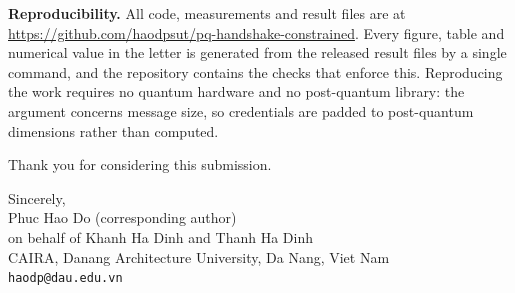 \documentclass[11pt]{article}
\begin{document}
\textbf{Reproducibility.} All code, measurements and result files are at
\url{https://github.com/haodpsut/pq-handshake-constrained}. Every figure, table and numerical
value in the letter is generated from the released result files by a single command, and the
repository contains the checks that enforce this. Reproducing the work requires no quantum
hardware and no post-quantum library: the argument concerns message size, so credentials are
padded to post-quantum dimensions rather than computed.

Thank you for considering this submission.

\vspace{0.8em}
Sincerely,\\
Phuc Hao Do (corresponding author)\\
on behalf of Khanh Ha Dinh and Thanh Ha Dinh\\
CAIRA, Danang Architecture University, Da Nang, Viet Nam\\
\texttt{haodp@dau.edu.vn}
\end{document}
